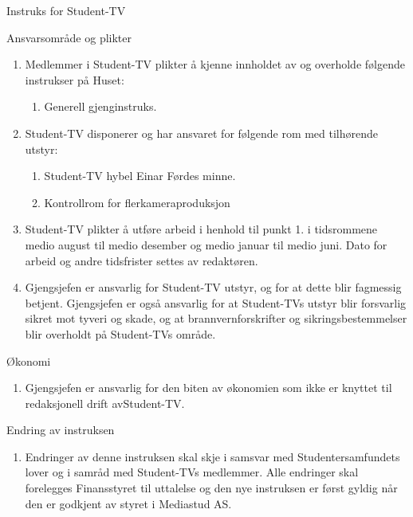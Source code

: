 \documentclass[../fsbok.tex]{subfiles}
\begin{document}
\begin{instruks*}{Instruks for Student-TV}
    \begin{instruksledd}{Ansvarsområde og plikter}
        \begin{enumerate}   
            \item  Medlemmer i Student-TV plikter å kjenne innholdet av og overholde følgende
                instrukser på Huset:
                \begin{enumerate}
                    \item Generell gjenginstruks.
                \end{enumerate}
            \item Student-TV disponerer og har ansvaret for følgende rom med tilhørende utstyr:
                \begin{enumerate}
                    \item Student-TV hybel Einar Førdes minne.
                    \item Kontrollrom for flerkameraproduksjon
                \end{enumerate}
            \item Student-TV plikter å utføre arbeid i henhold til punkt 1. i tidsrommene
                medio august til medio desember og medio januar til medio juni. Dato for arbeid og andre tidsfrister
                settes av redaktøren.
            \item Gjengsjefen er ansvarlig for Student-TV utstyr, og for at dette blir fagmessig
                betjent. Gjengsjefen er også ansvarlig for at Student-TVs utstyr blir forsvarlig sikret mot tyveri
                og skade, og at brannvernforskrifter og sikringsbestemmelser blir overholdt på Student-TVs område.
        \end{enumerate}
    \end{instruksledd}

    \begin{instruksledd}{Økonomi}
        \begin{enumerate}
            \item Gjengsjefen er ansvarlig for den biten av økonomien som ikke er knyttet til
                redaksjonell drift avStudent-TV.
        \end{enumerate}
    \end{instruksledd}

    \begin{instruksledd}{Endring av instruksen}
        \begin{enumerate}
            \item Endringer av denne instruksen skal skje i samsvar med Studentersamfundets
                lover og i samråd med Student-TVs medlemmer. Alle endringer skal forelegges Finansstyret til
                uttalelse og den nye instruksen er først gyldig når den er godkjent av styret i Mediastud AS.
        \end{enumerate}
    \end{instruksledd}


\end{instruks*}
\end{document}
